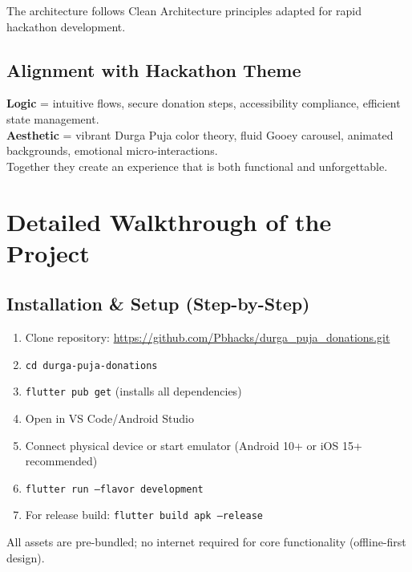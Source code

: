 \documentclass[11pt,a4paper]{article}
\begin{document}
The architecture follows Clean Architecture principles adapted for rapid hackathon development.

\subsection{Alignment with Hackathon Theme}
\textbf{Logic} = intuitive flows, secure donation steps, accessibility compliance, efficient state management. \\
\textbf{Aesthetic} = vibrant Durga Puja color theory, fluid Gooey carousel, animated backgrounds, emotional micro-interactions. \\
Together they create an experience that is both functional and unforgettable.

\section{Detailed Walkthrough of the Project}

\subsection{Installation \& Setup (Step-by-Step)}
\begin{enumerate}
    \item Clone repository: \url{https://github.com/Pbhacks/durga_puja_donations.git}
    \item \texttt{cd durga-puja-donations}
    \item \texttt{flutter pub get} (installs all dependencies)
    \item Open in VS Code/Android Studio
    \item Connect physical device or start emulator (Android 10+ or iOS 15+ recommended)
    \item \texttt{flutter run --flavor development}
    \item For release build: \texttt{flutter build apk --release}
\end{enumerate}

All assets are pre-bundled; no internet required for core functionality (offline-first design).
\end{document}
